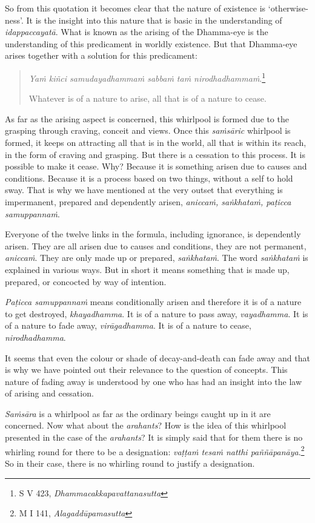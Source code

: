 So from this quotation it becomes clear that the nature of existence is `otherwise-ness'. It is the insight into this nature that is basic in the understanding of \emph{idappaccayatā}. What is known as the arising of the Dhamma-eye is the understanding of this predicament in worldly existence. But that Dhamma-eye arises together with a solution for this predicament:

\begin{quote}
\emph{Yaṁ kiñci samudayadhammaṁ sabbaṁ taṁ nirodhadhammaṁ}.\footnote{S V 423, \emph{Dhammacakkapavattanasutta}}

Whatever is of a nature to arise, all that is of a nature to cease.
\end{quote}

As far as the arising aspect is concerned, this whirlpool is formed due to the grasping through craving, conceit and views. Once this \emph{saṁsāric} whirlpool is formed, it keeps on attracting all that is in the world, all that is within its reach, in the form of craving and grasping. But there is a cessation to this process. It is possible to make it cease. Why? Because it is something arisen due to causes and conditions. Because it is a process based on two things, without a self to hold sway. That is why we have mentioned at the very outset that everything is impermanent, prepared and dependently arisen, \emph{aniccaṁ, saṅkhataṁ, paṭicca samuppannaṁ}.

Everyone of the twelve links in the formula, including ignorance, is dependently arisen. They are all arisen due to causes and conditions, they are not permanent, \emph{aniccaṁ}. They are only made up or prepared, \emph{saṅkhataṁ}. The word \emph{saṅkhataṁ} is explained in various ways. But in short it means something that is made up, prepared, or concocted by way of intention.

\emph{Paṭicca samuppannaṁ} means conditionally arisen and therefore it is of a nature to get destroyed, \emph{khayadhamma}. It is of a nature to pass away, \emph{vayadhamma}. It is of a nature to fade away, \emph{virāgadhamma}. It is of a nature to cease, \emph{nirodhadhamma}.

It seems that even the colour or shade of decay-and-death can fade away and that is why we have pointed out their relevance to the question of concepts. This nature of fading away is understood by one who has had an insight into the law of arising and cessation.

\emph{Saṁsāra} is a whirlpool as far as the ordinary beings caught up in it are concerned. Now what about the \emph{arahants}? How is the idea of this whirlpool presented in the case of the \emph{arahants}? It is simply said that for them there is no whirling round for there to be a designation: \emph{vaṭṭaṁ tesaṁ natthi paññāpanāya}.\footnote{M I 141, \emph{Alagaddūpamasutta}} So in their case, there is no whirling round to justify a designation.

